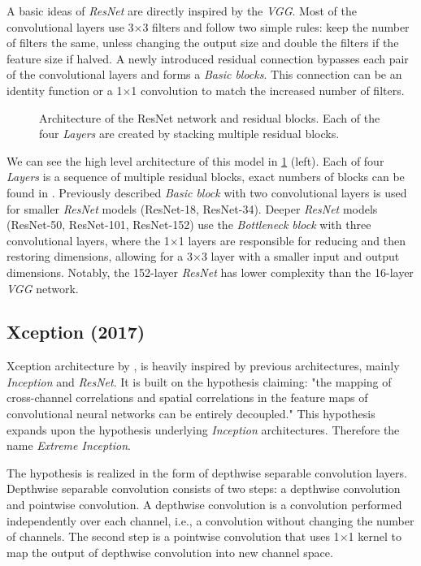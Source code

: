A basic ideas of \textit{ResNet} are directly inspired by the \textit{VGG}. Most of the convolutional layers use 3$\times$3 filters and follow two simple rules: keep the number of filters the same, unless changing the output size and double the filters if the feature size if halved. A newly introduced residual connection bypasses each pair of the convolutional layers and forms a \textit{Basic blocks}. This connection can be an identity function or a 1$\times$1 convolution to match the increased number of filters.

\begin{figure}
    \resnetArch
    \caption{Architecture of the ResNet network and residual blocks. Each of the four \textit{Layers} are created by stacking multiple residual blocks.}
    \label{fig:resnet_arch}
\end{figure}

We can see the high level architecture of this model in \cref{fig:resnet_arch} (left). Each of four \textit{Layers} is a sequence of multiple residual blocks, exact numbers of blocks can be found in \cite[table 1]{bib:resnet}. Previously described \textit{Basic block} with two convolutional layers is used for smaller \textit{ResNet} models (ResNet-18, ResNet-34). Deeper \textit{ResNet} models (ResNet-50, ResNet-101, ResNet-152) use the \textit{Bottleneck block} with three convolutional layers, where the 1$\times$1 layers are responsible for reducing and then restoring dimensions, allowing for a 3$\times$3 layer with a smaller input and output dimensions. Notably, the 152-layer \textit{ResNet} has lower complexity than the 16-layer \textit{VGG} network.



\subsection{Xception (2017)}
\label{sec:xception}
Xception architecture by \citeauthor{bib:xception} \cite{bib:xception}, is heavily inspired by previous architectures, mainly \textit{Inception} and \textit{ResNet}. It is built on the hypothesis claiming: "the mapping of cross-channel correlations and spatial correlations in the feature maps of convolutional neural networks can be entirely decoupled." This hypothesis expands upon the hypothesis underlying \textit{Inception} architectures. Therefore the name \textit{Extreme Inception}. 

The hypothesis is realized in the form of depthwise separable convolution layers. Depthwise separable convolution consists of two steps: a depthwise convolution and pointwise convolution. A depthwise convolution is a convolution performed independently over each channel, i.e., a convolution without changing the number of channels. The second step is a pointwise convolution that uses 1$\times$1 kernel to map the output of depthwise convolution into new channel space.

